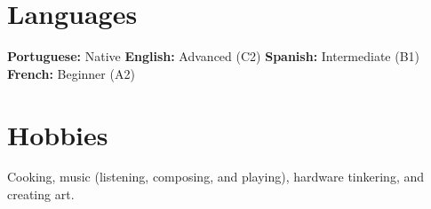 \documentclass[a4paper,10pt]{article}
\begin{document}
\section*{Languages}
\textbf{Portuguese:} Native \quad \textbf{English:} Advanced (C2) \quad \textbf{Spanish:} Intermediate (B1) \quad \textbf{French:} Beginner (A2)

\section*{Hobbies}
Cooking, music (listening, composing, and playing), hardware tinkering, and creating art.
\end{document}

